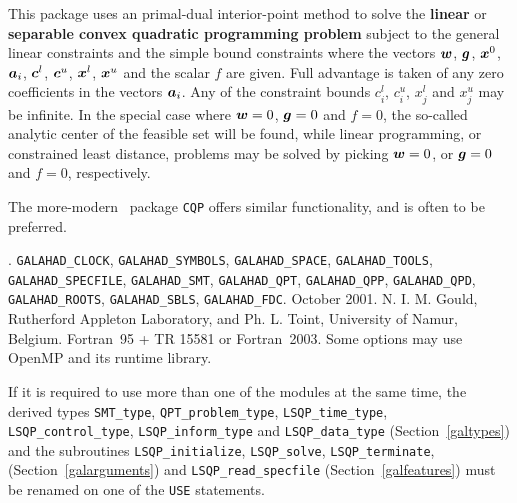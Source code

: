 \documentclass{galahad}
\newcommand{\packagename}{LSQP}
\newcommand{\fullpackagename}{\libraryname\_\-\packagename}
\begin{document}
\galheader


\galsummary
This package uses an primal-dual interior-point method
to solve the {\bf linear} or {\bf separable convex quadratic 
programming problem}
subject to the general linear constraints
and the simple bound constraints
where the vectors ${\bm{w}}$, ${\bm{g}}$, ${\bm{x}}^{0}$, 
${\bm{a}}_{i}$, ${\bm{c}}^{l}$, ${\bm{c}}^{u}$, ${\bm{x}}^{l}$, ${\bm{x}}^{u}$ and 
the scalar $f$ are given.
Full advantage is taken of any zero coefficients in the 
vectors ${\bm{a}}_{i}$. 
Any of the constraint bounds $c_{i}^{l}$, $c_{i}^{u}$, 
$x_{j}^{l}$ and $x_{j}^{u}$ may be infinite.
In the special case where ${\bm{w}} = 0$, ${\bm{g}} = 0$ and $f = 0$,
the so-called analytic center of the feasible set will be found,
while linear programming, or constrained least distance, problems
may be solved by picking ${\bm{w}} = 0$, or ${\bm{g}} = 0$ and $f = 0$, respectively.

The more-modern \galahad\ package {\tt CQP} offers similar functionality, and
is often to be preferred.


\galattributes
\galversions{\tt  \fullpackagename\_single, \fullpackagename\_double}.
\galuses 
{\tt GALAHAD\_\-CLOCK},
{\tt GALAHAD\_SY\-M\-BOLS}, 
{\tt GALAHAD\-\_SPACE}, 
{\tt GALAHAD\_TOOLS}, 
{\tt GALAHAD\_SPECFILE}, 
{\tt GALAHAD\_SMT}, 
{\tt GALAHAD\_QPT}, 
{\tt GALAHAD\_QPP}, 
{\tt GALAHAD\_\-QPD}, 
{\tt GALAHAD\-\_ROOTS}, 
{\tt GALAHAD\_SBLS},
{\tt GALAHAD\_FDC}.
\galdate October 2001.
\galorigin N. I. M. Gould, Rutherford Appleton Laboratory, and
Ph. L. Toint, University of Namur, Belgium.
\gallanguage Fortran~95 + TR 15581 or Fortran~2003. 
\galparallelism Some options may use OpenMP and its runtime library.


\galhowto



\noindent
If it is required to use more than one of the modules at the same time, 
the derived types
{\tt SMT\_type}, 
{\tt QPT\_problem\_type}, 
{\tt \packagename\_time\_type}, 
{\tt \packagename\_control\_type}, 
{\tt \packagename\_inform\_type} 
and
{\tt \packagename\_data\_type}
(Section~\ref{galtypes})
and the subroutines
{\tt \packagename\_initialize}, 
{\tt \packagename\_\-solve},
{\tt \packagename\_terminate},
(Section~\ref{galarguments})
and 
{\tt \packagename\_read\_specfile}
(Section~\ref{galfeatures})
must be renamed on one of the {\tt USE} statements.
\end{document}
